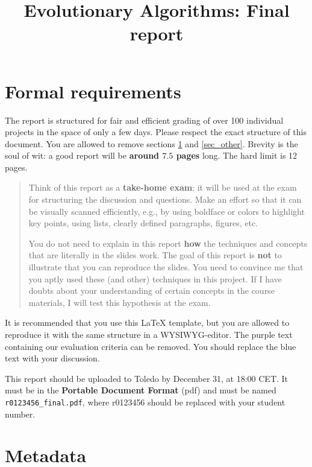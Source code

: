 \documentclass[a4paper,10pt]{article}
\title{Evolutionary Algorithms: Final report}
\author{\ReplaceMe{Your Name (r0123456)}}
\newcommand{\thisyear}{\the\year}
\newcommand{\deadlineCode}{December 31, \thisyear{} at 18:00 CET}
\newcommand{\deadlineReport}{\deadlineCode}
\newcommand{\RemoveMe}[1]{{\color{purple}#1}}
\begin{document}
\selectfont{}

\maketitle

\section{\RemoveMe{Formal requirements}} \label{sec_this}

\RemoveMe{The report is structured for fair and efficient grading of over 100 individual projects in the space of only a few days. Please respect the exact structure of this document. You are allowed to remove sections \ref{sec_this} and \ref{sec_other}. Brevity is the soul of wit: a good report will be \textbf{around $7.5$ pages} long. The hard limit is 12 pages. 

\begin{quote}
Think of this report as a \textbf{take-home exam}; it will be used at the exam for structuring the discussion and questions. Make an effort so that it can be visually scanned efficiently, e.g., by using boldface or colors to highlight key points, using lists, clearly defined paragraphs, figures, etc.

You do not need to explain in this report \textbf{how} the techniques and concepts that are literally in the slides work. The goal of this report is \textbf{not} to illustrate that you can reproduce the slides. You need to convince me that you aptly used these (and other) techniques in this project. If I have doubts about your understanding of certain concepts in the course materials, I will test this hypothesis at the exam.
\end{quote}

It is recommended that you use this \LaTeX{} template, but you are allowed to reproduce it with the same structure in a WYSIWYG-editor. The purple text containing our evaluation criteria can be removed. You should replace the blue text with your discussion.

This report should be uploaded to Toledo by \deadlineReport. It must be in the \textbf{Portable Document Format} (pdf) and must be named \texttt{r0123456\_final.pdf}, where r0123456 should be replaced with your student number.}

\section{Metadata}
\end{document}
